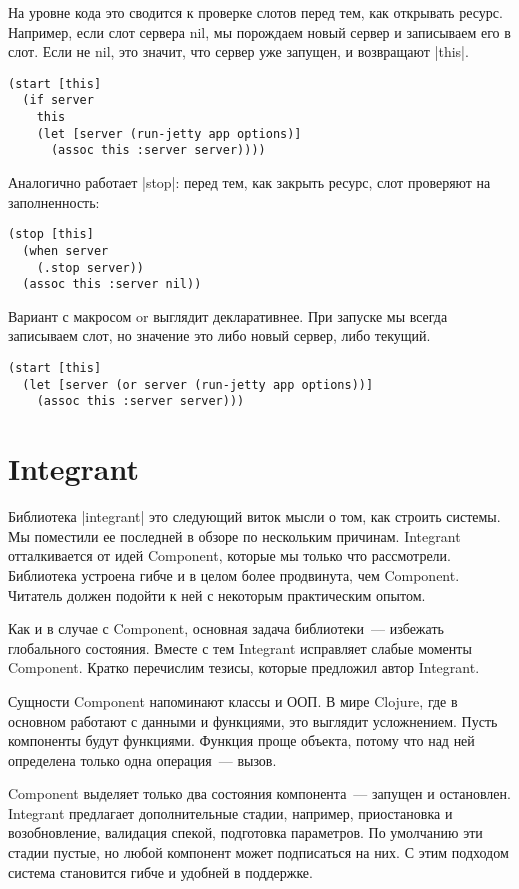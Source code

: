 На уровне кода это сводится к проверке слотов перед тем, как открывать
ресурс. Например, если слот сервера nil, мы порождаем новый сервер и записываем
его в слот. Если не nil, это значит, что сервер уже запущен, и возвращают
\spverb|this|.

\begin{verbatim}
(start [this]
  (if server
    this
    (let [server (run-jetty app options)]
      (assoc this :server server))))
\end{verbatim}

Аналогично работает \spverb|stop|: перед тем, как закрыть ресурс, слот проверяют на
заполненность:

\begin{verbatim}
(stop [this]
  (when server
    (.stop server))
  (assoc this :server nil))
\end{verbatim}

Вариант с макросом or выглядит декларативнее. При запуске мы всегда записываем
слот, но значение это либо новый сервер, либо текущий.

\begin{verbatim}
(start [this]
  (let [server (or server (run-jetty app options))]
    (assoc this :server server)))
\end{verbatim}

\section{Integrant}

Библиотека \spverb|integrant|
это следующий виток мысли о том, как строить системы. Мы поместили ее последней
в обзоре по нескольким причинам. Integrant отталкивается от идей Component,
которые мы только что рассмотрели. Библиотека устроена гибче и в целом более
продвинута, чем Component. Читатель должен подойти к ней с некоторым
практическим опытом.

Как и в случае с Component, основная задача библиотеки~--- избежать глобального
состояния. Вместе с тем Integrant исправляет слабые моменты Component. Кратко
перечислим тезисы, которые предложил автор Integrant.

Сущности Component напоминают классы и ООП. В мире Clojure, где в основном
работают с данными и функциями, это выглядит усложнением. Пусть компоненты будут
функциями. Функция проще объекта, потому что над ней определена только одна
операция~--- вызов.

Component выделяет только два состояния компонента~--- запущен и
остановлен. Integrant предлагает дополнительные стадии, например, приостановка и
возобновление, валидация спекой, подготовка параметров. По умолчанию эти стадии
пустые, но любой компонент может подписаться на них. С этим подходом система
становится гибче и удобней в поддержке.

